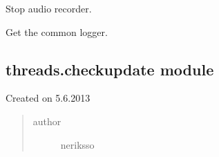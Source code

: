 \documentclass[letterpaper,10pt,english]{sphinxmanual}
\begin{document}
\begin{fulllineitems}
\begin{fulllineitems}
\end{fulllineitems}


\begin{fulllineitems}
\label{threads:threads.audiorecorder.AudioRecorder.stop}
Stop audio recorder.

\end{fulllineitems}


\end{fulllineitems}


\begin{fulllineitems}
\label{threads:threads.audiorecorder.logger}
Get the common logger.

\end{fulllineitems}



\subsection{threads.checkupdate module}
\label{threads:threads-checkupdate-module}\label{threads:module-threads.checkupdate}
Created on 5.6.2013
\begin{quote}\begin{description}
\item[{author}] \leavevmode
neriksso

\end{description}\end{quote}
\end{document}
